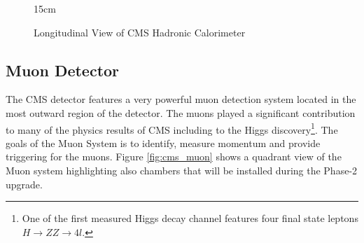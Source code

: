 \begin{figure}[!htm]{15cm} %
\caption{Longitudinal View of CMS Hadronic Calorimeter}%
\label{fig:hcal_layout}
\end{figure}

\subsection{Muon Detector}

The CMS detector features a very powerful muon detection system located in the most outward region of the detector. The muons played a significant contribution to many of the physics results of CMS including to the Higgs discovery\footnote{One of the first measured Higgs decay channel features four final state leptons $H \rightarrow ZZ \rightarrow 4 l$.}. The goals of the Muon System is to identify, measure momentum and provide triggering for the muons. Figure \ref{fig:cms_muon} shows a quadrant view of the Muon system highlighting also chambers that will be installed during the Phase-2 upgrade.

